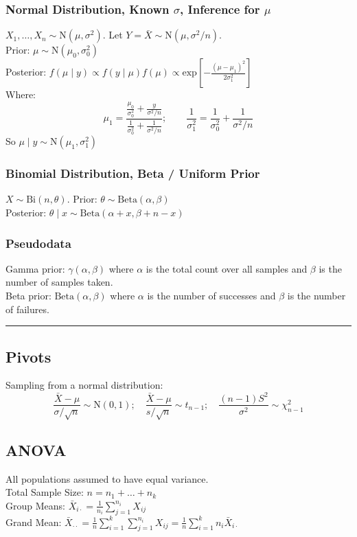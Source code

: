 \documentclass{article}
\begin{document}
\begin{multicols*}{2}
\subsubsection*{Normal Distribution, Known $\sigma$, Inference for $\mu$}
$X_{1}, \dots, X_{n} \sim \mbox{N}(\mu, \sigma^{2})$. Let $Y = \bar{X} \sim \mbox{N}(\mu, \sigma^{2}/n)$.\\
Prior: $\mu \sim \mbox{N}(\mu_{0}, \sigma^{2}_{0})$\\
Posterior: $f(\mu \mid y) \propto f(y \mid \mu) f(\mu) \propto \mbox{exp}\left[ -\frac{(\mu - \mu_{1})^{2}}{2 \sigma^{2}_{1}} \right]$\\
Where:
$$\mu_{1} = \frac{\frac{\mu_{0}}{\sigma^{2}_{0}} + \frac{y}{\sigma^{2}/n}}{\frac{1}{\sigma^{2}_{0}} + \frac{1}{\sigma^{2}/n}}; \qquad \frac{1}{\sigma^{2}_{1}} = \frac{1}{\sigma^{2}_{0}} + \frac{1}{\sigma^{2} / n}$$
So $\mu \mid y \sim \mbox{N}(\mu_{1}, \sigma^{2}_{1})$
\subsubsection*{Binomial Distribution, Beta / Uniform Prior}
$X \sim \mbox{Bi}(n, \theta)$. Prior: $\theta \sim \mbox{Beta}(\alpha, \beta)$\\
Posterior: $\theta \mid x \sim \mbox{Beta}(\alpha + x, \beta + n - x)$
\subsubsection*{Pseudodata}
Gamma prior: $\gamma(\alpha, \beta)$ where $\alpha$ is the total count over all samples and $\beta$ is the number of samples taken.\\
Beta prior: $\mbox{Beta}(\alpha, \beta)$ where $\alpha$ is the number of successes and $\beta$ is the number of failures.

\noindent\rule{\linewidth}{0.25pt}
\subsection*{Pivots}
Sampling from a normal distribution:
$$\frac{\bar{X} - \mu}{\sigma / \sqrt{n}} \sim \mbox{N}(0, 1); \quad \frac{\bar{X} - \mu}{s / \sqrt{n}} \sim t_{n-1}; \quad \frac{(n-1)S^{2}}{\sigma^{2}} \sim \chi^{2}_{n-1}$$

\newpage
\subsection*{ANOVA}
All populations assumed to have equal variance.\\
Total Sample Size: $n = n_{1} + \dots + n_{k}$\\
Group Means: $\bar{X}_{i\cdot} = \frac{1}{n_{i}}\sum_{j=1}^{n_{i}} X_{ij}$\\
Grand Mean: $\bar{X}_{\cdot \cdot} = \frac{1}{n}\sum_{i=1}^{k} \sum_{j=1}^{n_{i}} X_{ij} = \frac{1}{n}\sum_{i=1}^{k} n_{i}\bar{X}_{i\cdot}$


\end{multicols*}
\end{document}
